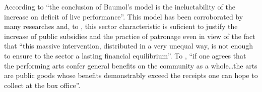 \documentclass[a4paper, 12pt, openright, oneside, german, french, brazil, english]{abntex2}
\begin{document}
	
	According to  ``the conclusion of Baumol's model is the ineluctability of the increase on deficit of live performance''. This model has been corroborated by many researches \cite[e.g.]{throsby1979economics,leroy1980economie,peacock1983inflation,baumol1984inflation,dias2011artes} and, to , this sector characteristic is suficient to justify the increase of public subsidies and the practice of patronage even in view of the fact that ``this massive intervention, distributed in a very unequal way, is not enough to ensure to the sector a lasting financial equilibrium''. To , ``if one agrees that the performing arts confer general benefits on the community as a whole\ldots the arts are public goods whose benefits demonstrably exceed the receipts one can hope to collect at the box office''. 
	
	
	
\end{document}
